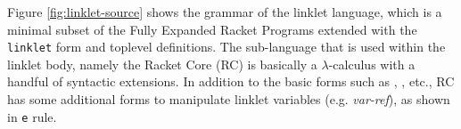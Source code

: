 
Figure \ref{fig:linklet-source} shows the grammar of the linklet
language, which is a minimal subset of the Fully Expanded Racket
Programs extended with the \verb|linklet| form and toplevel
definitions. The sub-language that is used within the linklet body,
namely the Racket Core (RC) is basically a $\lambda$-calculus with a handful
of syntactic extensions. In addition to the basic forms such
as , ,  etc., RC has
some additional forms to manipulate linklet variables
(e.g. \emph{var-ref}), as shown in \verb|e| rule. %

